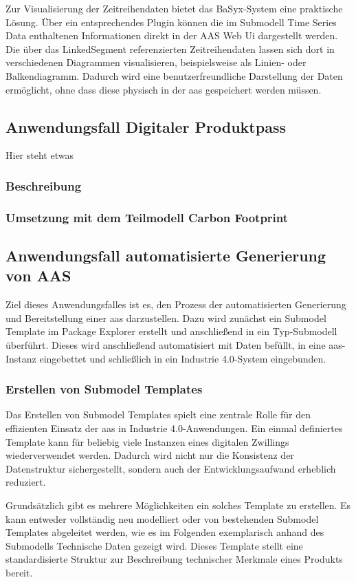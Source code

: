 Zur Visualisierung der Zeitreihendaten bietet das BaSyx-System eine praktische Lösung.
Über ein entsprechendes Plugin können die im Submodell Time Series Data enthaltenen Informationen direkt in der AAS Web Ui dargestellt werden.
Die über das LinkedSegment referenzierten Zeitreihendaten lassen sich dort in verschiedenen Diagrammen visualisieren, beispielsweise als Linien- oder Balkendiagramm.
Dadurch wird eine benutzerfreundliche Darstellung der Daten ermöglicht, ohne dass diese physisch in der \acs{aas} gespeichert werden müssen.

\newpage
\subsection{Anwendungsfall Digitaler Produktpass}
Hier steht etwas
\subsubsection{Beschreibung}
\subsubsection{Umsetzung mit dem Teilmodell Carbon Footprint}

\newpage
\subsection{Anwendungsfall automatisierte Generierung von AAS}
Ziel dieses Anwendungsfalles ist es, den Prozess der automatisierten Generierung und Bereitstellung einer \acs{aas} darzustellen.
Dazu wird zunächst ein Submodel Template im Package Explorer erstellt und anschließend in ein Typ-Submodell überführt.
Dieses wird anschließend automatisiert mit Daten befüllt, in eine \acs{aas}-Instanz eingebettet und schließlich in ein Industrie 4.0-System eingebunden.

\subsubsection{Erstellen von Submodel Templates}
Das Erstellen von Submodel Templates spielt eine zentrale Rolle für den effizienten Einsatz der \acs{aas} in Industrie 4.0-Anwendungen. 
Ein einmal definiertes Template kann für beliebig viele Instanzen eines digitalen Zwillings wiederverwendet werden. 
Dadurch wird nicht nur die Konsistenz der Datenstruktur sichergestellt, sondern auch der Entwicklungsaufwand erheblich reduziert.

Grundsätzlich gibt es mehrere Möglichkeiten ein solches Template zu erstellen.
Es kann entweder vollständig neu modelliert oder von bestehenden Submodel Templates abgeleitet werden, wie es im Folgenden exemplarisch anhand des Submodells Technische Daten \cite{SpezifikaitonTechnischeDaten} gezeigt wird.
Dieses Template stellt eine standardisierte Struktur zur Beschreibung technischer Merkmale eines Produkts bereit.

